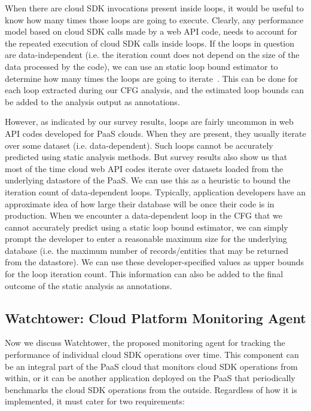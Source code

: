 When there are cloud SDK invocations present inside loops, it would be useful to know how many times those loops
are going to execute. Clearly, any performance model based on cloud SDK calls made by a web API code,
needs to account for the repeated execution of cloud SDK calls inside loops. If the 
loops in question are data-independent (i.e. the iteration count does not depend on the size of the data processed 
by the code), we can use an static loop bound estimator to determine how many times the loops are going to iterate~\cite{bygde2010static,Gulwani:2009:CRP:1542476.1542518,Lokuciejewski:2009:FPS:1545006.1545064,Hunt:2006:PCL:1167999.1168026}.
This can be done for each loop extracted during our CFG analysis, and the estimated loop bounds can be added to the
analysis output as annotations.

However, as indicated by our survey results, loops are fairly uncommon in web API codes developed for PaaS clouds. When
they are present, they usually iterate over some dataset (i.e. data-dependent). Such loops cannot
be accurately predicted using static analysis methods. But survey results also show us that
most of the time cloud web API codes iterate over datasets loaded from the underlying datastore of the PaaS.
We can use this as a heuristic to bound the iteration count of data-dependent loops. Typically, application developers
have an approximate idea of how large their database will be once their code is in production. When we encounter a data-dependent
loop in the CFG that we cannot accurately predict using a static loop bound estimator, we can simply
prompt the developer to enter a reasonable maximum size for the underlying database (i.e. the maximum number of
records/entities that may be returned from the datastore). We can
use these developer-specified values as upper bounds for the loop iteration count. 
This information can also be added to the final outcome of the static analysis as annotations.

\subsection{Watchtower: Cloud Platform Monitoring Agent}
Now we discuss Watchtower, the proposed monitoring agent for tracking the performance of individual
cloud SDK operations over time. This component can be an integral part of the PaaS cloud that
monitors cloud SDK operations from within, or it can be another application deployed on the PaaS
that periodically benchmarks the cloud SDK operations from the outside. Regardless of how it is
implemented, it must cater for two requirements:

